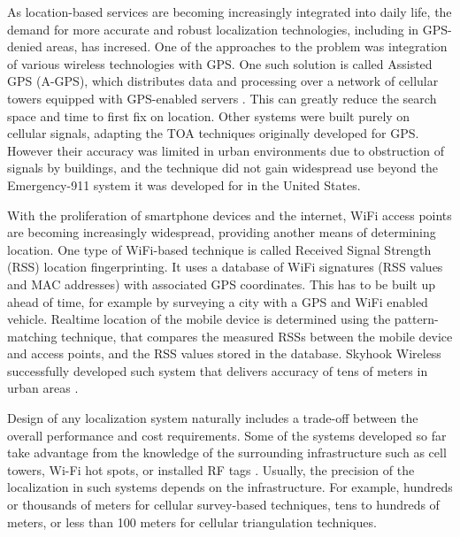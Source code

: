 As location-based services are becoming increasingly integrated into daily life,  the demand for more accurate and robust localization technologies, including in GPS-denied areas, has incresed. One of the approaches to the problem was integration of various wireless technologies with GPS. One such solution is called Assisted GPS (A-GPS), which distributes data and processing over a network of cellular towers equipped with GPS-enabled servers \cite{AGPS}. This can greatly reduce the search space and time to first fix on location. Other systems were built purely on cellular signals, adapting the TOA techniques originally developed for GPS. However their accuracy was limited in urban environments due to obstruction of signals by buildings, and the technique did not gain widespread use beyond the Emergency-911 system it was developed for in the United States.


With the proliferation of smartphone devices and the internet, WiFi access points are becoming increasingly widespread, providing another means of determining location. One type of WiFi-based technique is called Received Signal Strength (RSS) location fingerprinting. It uses a database of WiFi signatures (RSS values and MAC addresses) with associated GPS coordinates. This has to be built up ahead of time, for example by surveying a city with a GPS and WiFi enabled vehicle. 
Realtime location of the mobile device is determined using the pattern-matching technique, that compares the measured RSSs between the mobile device and access points, and the RSS values stored in the database. Skyhook Wireless successfully developed such system that delivers accuracy of tens of meters in urban areas \cite{Skyhook}. 

Design of any localization system naturally includes a trade-off between the overall performance and cost requirements. Some of the systems developed so far take advantage from the knowledge of the surrounding infrastructure such as
cell towers, Wi-Fi hot spots, or installed RF tags \cite{GeoLoc}. Usually, the precision of the localization in such systems depends on the infrastructure. For example,  hundreds or thousands of meters for cellular survey-based techniques, tens to hundreds of meters, or less than 100 meters for cellular triangulation techniques.


